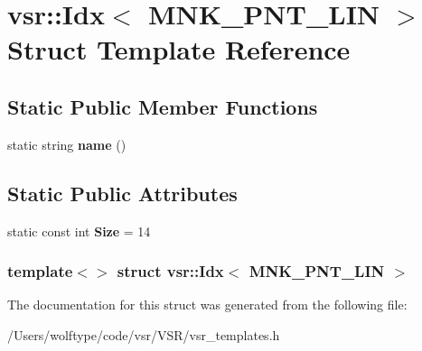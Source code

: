 \hypertarget{structvsr_1_1_idx_3_01_m_n_k___p_n_t___l_i_n_01_4}{\section{vsr\-:\-:Idx$<$ M\-N\-K\-\_\-\-P\-N\-T\-\_\-\-L\-I\-N $>$ Struct Template Reference}
\label{structvsr_1_1_idx_3_01_m_n_k___p_n_t___l_i_n_01_4}
}
\subsection*{Static Public Member Functions}
\begin{DoxyCompactItemize}
\item 
\hypertarget{structvsr_1_1_idx_3_01_m_n_k___p_n_t___l_i_n_01_4_a62e8bd436796d4b7e0dfd014ed6d9b7b}{static string {\bfseries name} ()}\label{structvsr_1_1_idx_3_01_m_n_k___p_n_t___l_i_n_01_4_a62e8bd436796d4b7e0dfd014ed6d9b7b}

\end{DoxyCompactItemize}
\subsection*{Static Public Attributes}
\begin{DoxyCompactItemize}
\item 
\hypertarget{structvsr_1_1_idx_3_01_m_n_k___p_n_t___l_i_n_01_4_a77622ef72e359e77d5a4dff444a37946}{static const int {\bfseries Size} = 14}\label{structvsr_1_1_idx_3_01_m_n_k___p_n_t___l_i_n_01_4_a77622ef72e359e77d5a4dff444a37946}

\end{DoxyCompactItemize}
\subsubsection*{template$<$$>$ struct vsr\-::\-Idx$<$ M\-N\-K\-\_\-\-P\-N\-T\-\_\-\-L\-I\-N $>$}



The documentation for this struct was generated from the following file\-:\begin{DoxyCompactItemize}
\item 
/\-Users/wolftype/code/vsr/\-V\-S\-R/vsr\-\_\-templates.\-h\end{DoxyCompactItemize}
